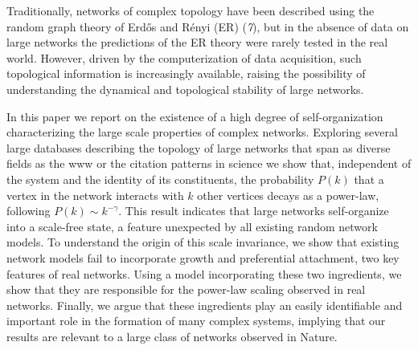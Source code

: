 Traditionally, networks of complex topology have been described using the random graph theory of Erd\H{o}s and R\'enyi (ER) ({\it 7}), but in the absence of data on large networks the predictions of the  ER theory were rarely tested in the real world. However, driven by the computerization of data acquisition, such topological information is increasingly available, raising the possibility of  understanding the dynamical and topological stability of large networks. 


In this paper we report on the existence of a  high degree of self-organization characterizing  the large scale properties of complex networks. Exploring several large databases describing the topology of large networks that span as diverse fields as the www or the citation patterns in science we show that, independent of the system and the identity of its constituents, the probability $P(k)$ that a vertex in the  network interacts with $k$ other vertices decays as a power-law, following $P(k)\sim k^{-\gamma}$.  This result indicates that large networks self-organize into a scale-free state, a feature unexpected by all existing random network models. To understand the origin of this scale invariance, we show that existing network models fail to incorporate growth and preferential attachment, two key features of real networks. Using a model incorporating these two ingredients, we show that they are responsible for the power-law scaling observed in real networks. Finally, we argue that these ingredients play an easily identifiable and important role in the formation of many complex systems, implying that our results are relevant to a large class of networks observed in Nature.

